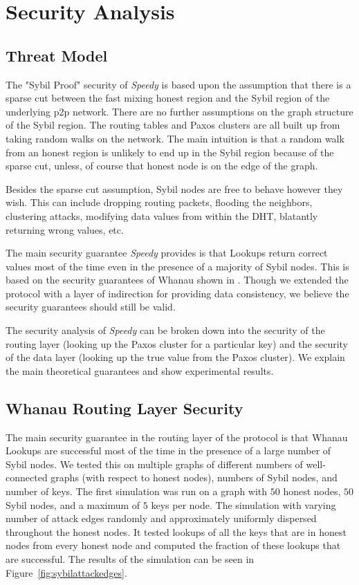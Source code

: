 \documentclass[letter]{article}
\newcommand{\sys}{\textit{Speedy}}
\begin{document}
\section{Security Analysis}

\subsection{Threat Model}
The "Sybil Proof" security of \sys{} is based upon the assumption that there is a sparse cut between the fast mixing honest region and the Sybil region of the underlying p2p network. There are no further assumptions on the graph structure of the Sybil region. The routing tables and Paxos clusters are all built up from taking random walks on the network. The main intuition is that a random walk from an honest region is unlikely to end up in the Sybil region because of the sparse cut, unless, of course that honest node is on the edge of the graph.

Besides the sparse cut assumption, Sybil nodes are free to behave however they wish. This can include dropping routing packets, flooding the neighbors, clustering attacks, modifying data values from within the DHT, blatantly returning wrong values, etc.

The main security guarantee \sys{} provides is that Lookups return correct values most of the time even in the presence of a majority of Sybil nodes. This is based on the security guarantees of Whanau shown in \cite{whanau}. Though we extended the protocol with a layer of indirection for providing data consistency, we believe the security guarantees should still be valid.

The security analysis of \sys{} can be broken down into the security of the routing layer (looking up the Paxos cluster for a particular key) and the security of the data layer (looking up the true value from the Paxos cluster). We explain the main theoretical guarantees and show experimental results.

\subsection{Whanau Routing Layer Security}
The main security guarantee in the routing layer of the protocol is that Whanau Lookups are successful most of the time in the presence of a large number of Sybil nodes. We tested this on multiple graphs of different numbers of well-connected graphs (with respect to honest nodes), numbers of Sybil nodes, and number of keys. The first simulation was run on a graph with $50$ honest nodes, $50$ Sybil nodes, and a maximum of $5$ keys per node. The simulation with varying number of attack edges randomly and approximately uniformly dispersed throughout the honest nodes. It tested lookups of all the keys that are in honest nodes from every honest node and computed the fraction of these lookups that are successful. The results of the simulation can be seen in Figure~\ref{fig:sybilattackedges}. 
\end{document}
